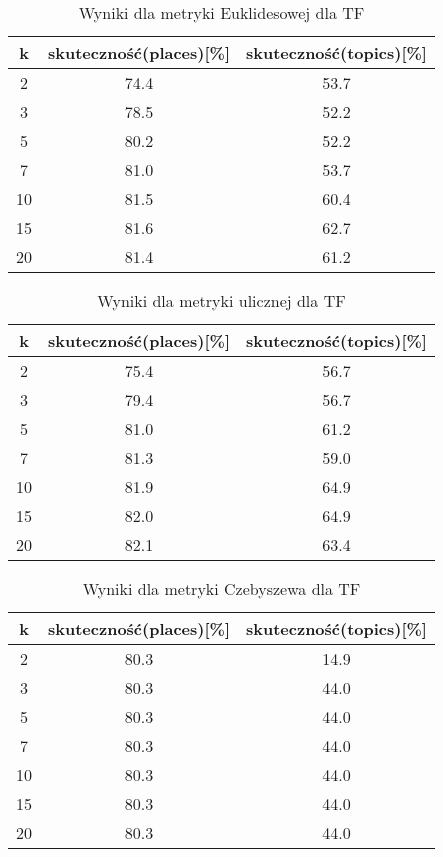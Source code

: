 \documentclass{classrep}
\begin{document}
\begin{table}[H]
	\centering
	\begin{tabular}{c c c} 
		\hline
		\textbf{k} & \textbf{skuteczność(places)[\%]} & \textbf{skuteczność(topics)[\%]} \\ [0.5ex] 
		\hline
		\hline 
		2 & 74.4 & 53.7 \\ 
		3 & 78.5 & 52.2 \\
		5 & 80.2 & 52.2 \\
		7 & 81.0 & 53.7 \\
		10 & 81.5 & 60.4 \\
		15 & 81.6 & 62.7 \\
		20 & 81.4 & 61.2 \\ 
		\hline
	\end{tabular}
	\caption{Wyniki dla metryki Euklidesowej dla TF}
\end{table}

\begin{table}[H]
	\centering
	\begin{tabular}{c c c} 
		\hline
		\textbf{k} & \textbf{skuteczność(places)[\%]} & \textbf{skuteczność(topics)[\%]} \\ [0.5ex] 
		\hline
		\hline 
		2 & 75.4 & 56.7 \\ 
		3 & 79.4 & 56.7 \\
		5 & 81.0 & 61.2 \\
		7 & 81.3 & 59.0 \\
		10 & 81.9 & 64.9 \\
		15 & 82.0 & 64.9 \\
		20 & 82.1 & 63.4 \\ 
		\hline
	\end{tabular}
	\caption{Wyniki dla metryki ulicznej dla TF}
\end{table}

\begin{table}[H]
	\centering
	\begin{tabular}{c c c} 
		\hline
		\textbf{k} & \textbf{skuteczność(places)[\%]} & \textbf{skuteczność(topics)[\%]} \\ [0.5ex] 
		\hline
		\hline 
		2 & 80.3 & 14.9 \\ 
		3 & 80.3 & 44.0 \\
		5 & 80.3 & 44.0 \\
		7 & 80.3 & 44.0 \\
		10 & 80.3 & 44.0 \\
		15 & 80.3 & 44.0 \\
		20 & 80.3 & 44.0 \\ 
		\hline
	\end{tabular}
	\caption{Wyniki dla metryki Czebyszewa dla TF}
\end{table}
\end{document}
